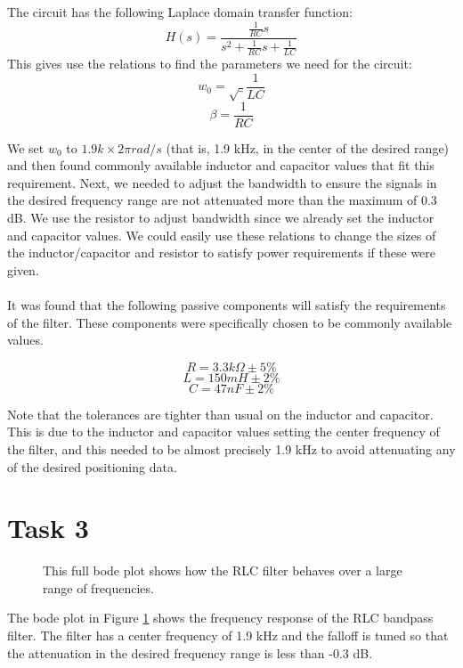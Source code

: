 \documentclass[12pt]{report}
\begin{document}
The circuit has the following Laplace domain transfer function:
$$ H(s) = \frac{\frac{1}{RC}s}{s^2+\frac{1}{RC}s+\frac{1}{LC}} $$
This gives use the relations to find the parameters we need for the circuit:
$$ w_0 = \sqrt_{\frac{1}{LC}} $$
$$ \beta = \frac{1}{RC} $$

We set $w_0$ to $1.9 k \times 2\pi rad/s$  (that is, 1.9 kHz, in the center of the desired range) and then found commonly available inductor and capacitor values that fit this requirement. Next, we needed to adjust the bandwidth to ensure the signals in the desired frequency range are not attenuated more than the maximum of 0.3 dB. We use the resistor to adjust bandwidth since we already set the inductor and capacitor values. We could easily use these relations to change the sizes of the inductor/capacitor and resistor to satisfy power requirements if these were given. \\
\pagebreak
\\
It was found that the following passive components will satisfy the requirements of the filter. These components were specifically chosen to be commonly available values.

$$ R = 3.3 k\Omega \pm 5\% $$
$$ L = 150 mH \pm 2\% $$
$$ C = 47 nF \pm 2\% $$

Note that the tolerances are tighter than usual on the inductor and capacitor. This is due to the inductor and capacitor values setting the center frequency of the filter, and this needed to be almost precisely 1.9 kHz to avoid attenuating any of the desired positioning data.



\hypertarget{task-3-1}{%
\section{Task 3}\label{task-3-1}}

    \begin{figure}[h!]
\begin{center}
\end{center}
\caption{This full bode plot shows how the RLC filter behaves over a large range of frequencies.}
\label{fig:fullbode}
\end{figure}

The bode plot in Figure \ref{fig:fullbode} shows the frequency response of the RLC bandpass filter. The filter has a center frequency of 1.9 kHz and the falloff is tuned so that the attenuation in the desired frequency range is less than -0.3 dB.
\end{document}
